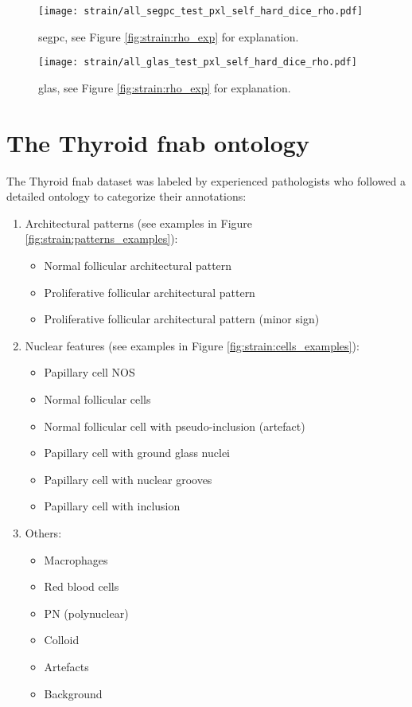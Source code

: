 \begin{figure}
    \centering
    \texttt{[image: strain/all\_segpc\_test\_pxl\_self\_hard\_dice\_rho.pdf]}
    \caption{\acrshort{segpc}, see Figure \ref{fig:strain:rho_exp} for explanation.}
    \label{app:strain:fig:rho_exp_segpc}
\end{figure} 

\begin{figure}
    \centering
    \texttt{[image: strain/all\_glas\_test\_pxl\_self\_hard\_dice\_rho.pdf]}
    \caption{\acrshort{glas}, see Figure \ref{fig:strain:rho_exp} for explanation.}
    \label{app:strain:fig:rho_exp_glas}
\end{figure}
  
\section{The Thyroid \acrshort{fnab} ontology}
\label{app:strain:sec:thyroidontology}

The Thyroid \acrshort{fnab} dataset was labeled by experienced pathologists who followed a detailed ontology to categorize their annotations:


\begin{enumerate}
	\item Architectural patterns (see examples in Figure \ref{fig:strain:patterns_examples}):
	\begin{itemize}
		\item Normal follicular architectural pattern
		\item Proliferative follicular architectural pattern
		\item Proliferative follicular architectural pattern (minor sign)
	\end{itemize}
	\item Nuclear features (see examples in Figure \ref{fig:strain:cells_examples}):
	\begin{itemize}
		\item Papillary cell NOS
		\item Normal follicular cells
		\item Normal follicular cell with pseudo-inclusion (artefact)
		\item Papillary cell with ground glass nuclei
		\item Papillary cell with nuclear grooves
		\item Papillary cell with inclusion
	\end{itemize}
	\item Others:
	\begin{itemize}
		\item Macrophages
		\item Red blood cells
		\item PN (polynuclear)
		\item Colloid
		\item Artefacts
		\item Background
	\end{itemize}
\end{enumerate}

